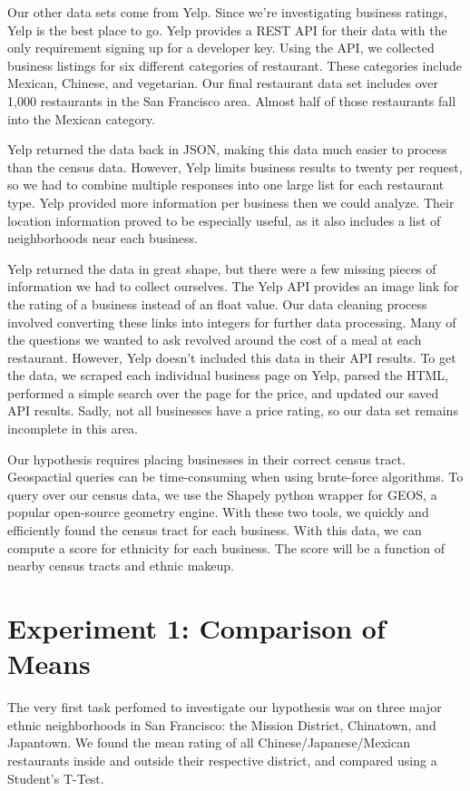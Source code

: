 \documentclass[11pt,twocolumn]{article}
\begin{document}
Our other data sets come from Yelp. Since we're investigating business ratings, Yelp is the best place to go. Yelp provides a REST API for their data with the only requirement signing up for a developer key. Using the API, we collected business listings for six different categories of restaurant. These categories include Mexican, Chinese, and vegetarian. Our final restaurant data set includes over 1,000 restaurants in the San Francisco area. Almost half of those restaurants fall into the Mexican category.

Yelp returned the data back in JSON, making this data much easier to process than the census data. However, Yelp limits business results to twenty per request, so we had to combine multiple responses into one large list for each restaurant type. Yelp provided more information per business then we could analyze. Their location information proved to be especially useful, as it also includes a list of neighborhoods near each business.

Yelp returned the data in great shape, but there were a few missing pieces of information we had to collect ourselves. The Yelp API provides an image link for the rating of a business instead of an float value. Our data cleaning process involved converting these links into integers for further data processing. Many of the questions we wanted to ask revolved around the cost of a meal at each restaurant. However, Yelp doesn't included this data in their API results. To get the data, we scraped each individual business page on Yelp, parsed the HTML, performed a simple search over the page for the price, and updated our saved API results. Sadly, not all businesses have a price rating, so our data set remains incomplete in this area.

Our hypothesis requires placing businesses in their correct census tract. Geospactial queries can be time-consuming when using brute-force algorithms. To query over our census data, we use the Shapely python wrapper for GEOS, a popular open-source geometry engine. With these two tools, we quickly and efficiently found the census tract for each business. With this data, we can compute a score for ethnicity for each business. The score will be a function of nearby census tracts and ethnic makeup.

\section{Experiment 1: Comparison of Means}

The very first task perfomed to investigate our hypothesis was on three major ethnic neighborhoods in San Francisco: the Mission District, Chinatown, and Japantown. We  found the mean rating of all Chinese/Japanese/Mexican restaurants inside and outside their respective district, and compared using a Student's T-Test. 
\end{document}
